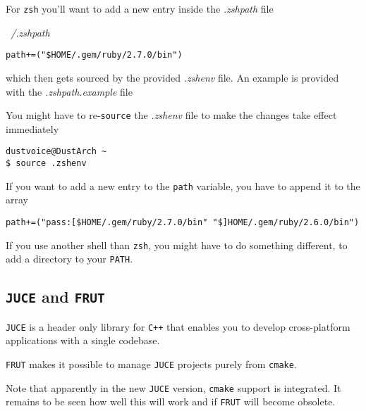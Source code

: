 \documentclass[10pt]{dustdoc}
\begin{document}
For \texttt{zsh} you’ll want to add a new entry inside the \textit{.zshpath} file

\begin{mintedlisting}
    \caption*{\textit{~/.zshpath}}
    \begin{verbatim}
path+=("$HOME/.gem/ruby/2.7.0/bin")
    \end{verbatim}
\end{mintedlisting}

\noindent
which then gets sourced by the provided \textit{.zshenv} file.
An example is provided with the \textit{.zshpath.example} file

\begin{NOTE}
    You might have to re-\texttt{source} the \textit{.zshenv} file to make the changes take effect immediately

    \begin{verbatim}
dustvoice@DustArch ~
$ source .zshenv
    \end{verbatim}
\end{NOTE}
\begin{NOTE}
    If you want to add a new entry to the \texttt{path} variable, you have to append it to the array

    \begin{verbatim}
path+=("pass:[$HOME/.gem/ruby/2.7.0/bin" "$]HOME/.gem/ruby/2.6.0/bin")
    \end{verbatim}
\end{NOTE}
\begin{NOTE}
    If you use another shell than \texttt{zsh}, you might have to do something different, to add a directory to your \texttt{PATH}.

\end{NOTE}

\subsection{\texttt{JUCE} and \texttt{FRUT}}
\label{sec:juce-and-frut}

\texttt{JUCE} is a header only library for \texttt{C++} that enables you to develop cross-platform applications with a single codebase.

\texttt{FRUT} makes it possible to manage \texttt{JUCE} projects purely from \texttt{cmake}.

\begin{NOTE}
    Note that apparently in the new \texttt{JUCE} version, \texttt{cmake} support is integrated.
    It remains to be seen how well this will work and if \texttt{FRUT} will become obsolete.
\end{NOTE}
\end{document}
